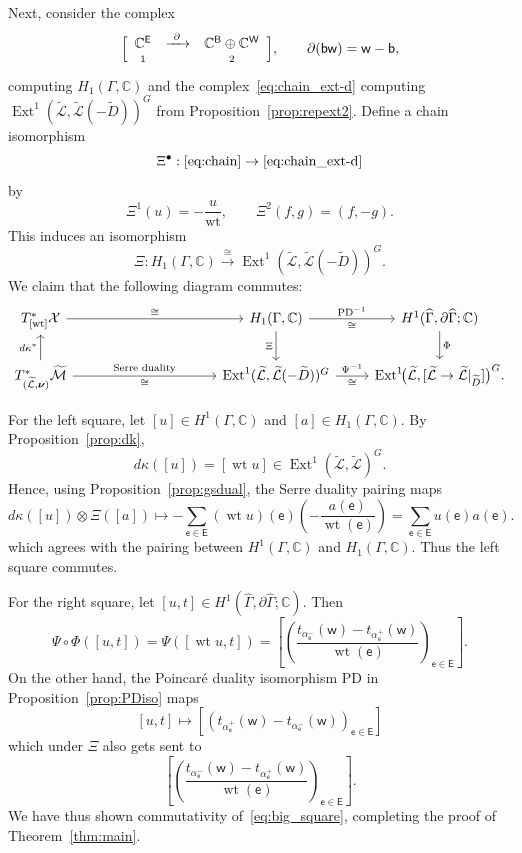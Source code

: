 \documentclass[dvipsnames,11pt]{article}
\theoremstyle{definition}
\newcommand{\wt}{\operatorname{wt}}
\newcommand{\C}{{\mathbb C}}
\def\B{\mathsf B}
\def\W{\mathsf W}
\def\w{\mathsf w}
\def\b{\mathsf b}
\def\e{\mathsf e}
\def\E{\mathsf E}
\def\graph{\Gamma}
\def\Ext{\operatorname{Ext}}
\def\PD{\mathrm{PD}}
\newcommand{\be}{\begin{equation}}
\newcommand{\ee}{\end{equation}}
\def\Ext{\operatorname{Ext}}
\begin{document}
Next, consider the complex
\be \label{eq:chain}
\Bigl[
\begin{array}{c c c}
\C^{\E} & \xrightarrow{\ \partial\ } & \C^{\B}\oplus \C^{\W}\\[-.4ex]
{\scriptstyle 1} && {\scriptstyle 2}
\end{array}
\Bigr],
\qquad
\partial(\b\w)=\w-\b,
\ee
computing $H_1(\graph,\C)$ and the complex~\eqref{eq:chain_ext-d} computing \(\Ext^1(\widetilde{\mathcal L},\widetilde{\mathcal L}(-\widetilde D))^G\) from Proposition~\ref{prop:repext2}. Define a chain isomorphism \[\Xi^\bullet: \eqref{eq:chain} \to \eqref{eq:chain_ext-d}\] by
\[
\Xi^1(u)=-\frac{u}{\wt},
\qquad
\Xi^2(f,g)=(f,-g).
\]
This induces an isomorphism
\[
\Xi:H_1(\graph,\C)
\xrightarrow{\cong}
\Ext^1(\widetilde{\mathcal L},\widetilde{\mathcal L}(-\widetilde D))^G.
\]
We claim that the following diagram commutes:
\[
\begin{tikzcd}T^*_{[\wt]}\mathcal X
  \arrow[r,"\cong"]
&[8em]
H_1(\graph,\C)
  \arrow[r,"{{\PD^{-1}}}","\cong"']
  \arrow[d,"\Xi"']
&
H^1(\widehat \graph, \partial \widehat \graph;\C)
  \arrow[d,"\Phi"]
\\
T^*_{(\widetilde{\mathcal L},\bm\nu)}\widetilde{\mathcal M}
  \arrow[u,"d\kappa^*"]
  \arrow[r,"{\text{Serre duality}}","\cong"']
&
\Ext^1(\widetilde{\mathcal L},\widetilde{\mathcal L}(-\widetilde D))^G
  \arrow[r,"\cong"',"\Psi^{-1}"]
&
\Ext^1\!\bigl(\widetilde{\mathcal L},
[\widetilde{\mathcal L}\to \widetilde{\mathcal L}|_{\widetilde D}]
\bigr)^G.
\end{tikzcd}
\]

For the left square, let \([u]\in H^1(\graph,\C)\) and \([a]\in H_1(\graph,\C) \).
By Proposition~\ref{prop:dk},
\[
d\kappa([u])=[\wt u]
\in
\Ext^1(\widetilde{\mathcal L},\widetilde{\mathcal L})^G.
\]
Hence, using Proposition~\ref{prop:gsdual}, the Serre duality pairing maps
\[
 d\kappa([u]) \otimes \Xi([a]) \mapsto 
-\sum_{\e\in\E} (\wt u)(\e)\left(-\frac{a(\e)}{\wt(\e)}\right)
=
\sum_{\e\in\E}u(\e)a(\e).
\]
which agrees with the pairing between $H^1(\graph,\C)$ and $H_1(\graph,\C)$. Thus the left square commutes.

For the right square, let $[u,t] \in H^1(\widehat\graph,\partial \widehat \Gamma;\C).$ Then
\[
\Psi \circ \Phi([u,t]) = \Psi([\wt u,t]) = \left[\left(\frac{t_{\alpha_\e^-}(\w)-t_{\alpha_\e^+}(\w)}{\wt(\e)}\right)_{\e \in \E}\right].
\]
On the other hand, the Poincar\'e duality isomorphism $\PD$ in Proposition~\ref{prop:PDiso} maps \[[u,t]\mapsto[({t_{\alpha_\e^+}(\w)-t_{\alpha_\e^-}(\w)})_{\e \in \E}]\] which under $\Xi$ also gets sent to \[\left[\left(\frac{t_{\alpha_\e^-}(\w)-t_{\alpha_\e^+}(\w)}{\wt(\e)}\right)_{\e \in \E}\right].\]
We have thus shown commutativity of~\eqref{eq:big_square}, completing the proof of Theorem~\ref{thm:main}.
\end{document}
